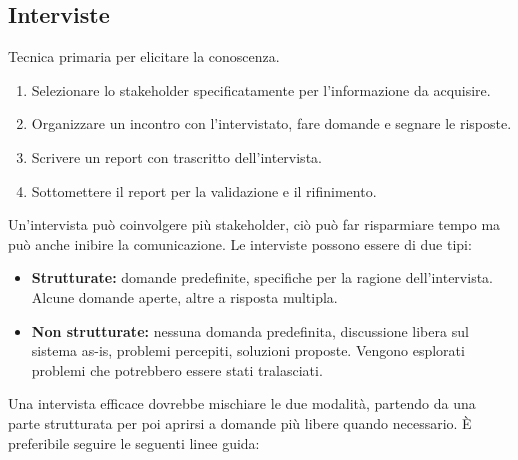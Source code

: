 \documentclass[../main.tex]{subfiles}
\begin{document}
\subsection{Interviste}
Tecnica primaria per elicitare la conoscenza.
\begin{enumerate}
	\item Selezionare lo stakeholder specificatamente per l'informazione da acquisire.
	\item Organizzare un incontro con l'intervistato, fare domande e segnare le risposte.
	\item Scrivere un report con trascritto dell'intervista.
	\item Sottomettere il report per la validazione e il rifinimento.
\end{enumerate}
Un'intervista può coinvolgere più stakeholder, ciò può far risparmiare tempo ma può anche inibire la comunicazione.
Le interviste possono essere di due tipi:
\begin{itemize}
	\item \textbf{Strutturate:} domande predefinite, specifiche per la ragione dell'intervista. Alcune domande aperte, altre a risposta multipla. 
	\item \textbf{Non strutturate:} nessuna domanda predefinita, discussione libera sul sistema as-is, problemi percepiti, soluzioni proposte. Vengono esplorati problemi che potrebbero essere stati tralasciati.
\end{itemize}
Una intervista efficace dovrebbe mischiare le due modalità, partendo da una parte strutturata per poi aprirsi a domande più libere quando necessario.
È preferibile seguire le seguenti linee guida:
\end{document}
